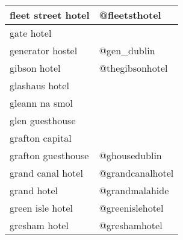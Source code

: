 \begin{table}[h!]
\begin{tabular}{|p{7cm}|p{5cm}|}
fleet street hotel & @fleetsthotel \\ \hline
gate hotel &  \\ \hline
generator hostel & @gen\_dublin \\ \hline
gibson hotel & @thegibsonhotel \\ \hline
glashaus hotel &  \\ \hline
gleann na smol &  \\ \hline
glen guesthouse &  \\ \hline
grafton capital &  \\ \hline
grafton guesthouse & @ghousedublin \\ \hline
grand canal hotel & @grandcanalhotel \\ \hline
grand hotel & @grandmalahide \\ \hline
green isle hotel & @greenislehotel \\ \hline
gresham hotel & @greshamhotel \\ \hline
\end{tabular}
\end{table}



